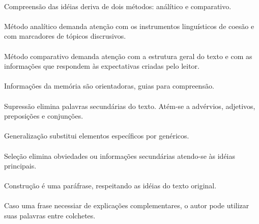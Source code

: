 \paragraph{}
Compreensão das idéias deriva de dois métodos: análítico e comparativo.

\paragraph{}
Método analítico demanda atenção com os instrumentos linguísticos de coesão e com marcadores de tópicos discrusivos.

\paragraph{}
Método comparativo demanda atenção com a estrutura geral do texto e com as informações que respondem às expectativas criadas pelo leitor.

\paragraph{}
Informações da memória são orientadoras, guias para compreensão.

\paragraph{}
Supressão elimina palavras secundárias do texto. Atém-se a advérvios, adjetivos, preposições e conjunções.

\paragraph{}
Generalização substitui elementos específicos por genéricos.

\paragraph{}
Seleção elimina obviedades ou informações secundárias atendo-se às idéias principais.

\paragraph{}
Construção é uma paráfrase, respeitando as idéias do texto original.

\paragraph{}
Caso uma frase necessiar de explicações complementares, o autor pode utilizar suas palavras entre colchetes.

